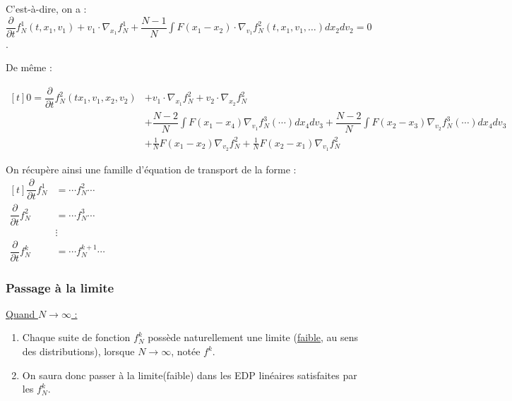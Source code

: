 \documentclass[12pt,a4paper]{article}
\begin{document}
	C'est-à-dire, on a : $\dfrac{\partial}{\partial t} f_N^1(t,x_1,v_1) + v_1\cdot \nabla_{x_1} f_N^1 + \dfrac{N-1}{N} \displaystyle\int F(x_1-x_2)\cdot \nabla_{v_1} f_N^2(t,x_1,v_1,\ldots)dx_2 dv_2 = 0$.
	
	De même :
	
	$ \begin{aligned}[t]
		0 = \dfrac{\partial}{\partial t} f_N^2(tx_1,v_1,x_2,v_2)
		&+v_1 \cdot \nabla_{x_1}f_N^2 + v_2 \cdot\nabla_{x_2}f_N^2 \\
		&+ \dfrac{N-2}{N}\displaystyle\int F(x_1-x_4)\nabla_{v_1}f_N^3(\cdots)dx_4 dv_3 + \dfrac{N-2}{N}\displaystyle\int F(x_2-x_3)\nabla_{v_2}f_N^3(\cdots)dx_4 dv_3 \\
		&+ \frac{1}{N}F(x_1-x_2)\nabla_{v_2} f_N^2 + \frac{1}{N}F(x_2-x_1)\nabla_{v_1}f_N^2
	\end{aligned}$
	
	On récupère ainsi une famille d'équation de transport de la forme : $\begin{aligned}[t]
		\dfrac{\partial }{\partial t} f_N^1 
		&= \cdots f_N^2 \cdots\\
		\dfrac{\partial}{\partial t} f_N^2
		&= \cdots f_N^3 \cdots\\
		&\vdots\\
		\dfrac{\partial}{\partial t} f_N^k
		&= \cdots f_N^{k+1} \cdots
	\end{aligned}$
	
	\newpage
	
	\subsubsection{Passage à la limite}
	
	\hspace{-.8cm}
	
	\underline{Quand $N \to \infty$ :} \begin{minipage}[t]{16cm}
		
		\vspace{-.25cm}
		
		\begin{enumerate}
		\item  Chaque suite de fonction $f_N^k$ possède naturellement une limite (\underline{\underline{faible}}, au sens des distributions), lorsque $N\to\infty$, notée $f^k$.
		
		\item  On saura donc passer à la limite(faible) dans les EDP linéaires satisfaites par les $f_N^k$.
	\end{enumerate}
	\end{minipage}
	
\end{document}
